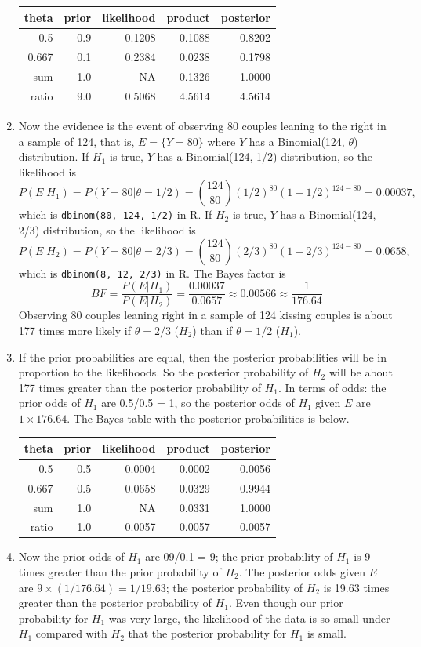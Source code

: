 \documentclass[
]{book}
\theoremstyle{definition}
\theoremstyle{definition}
\theoremstyle{definition}
\theoremstyle{remark}
\begin{document}
\begin{enumerate}
  \begin{tabular}{r|r|r|r|r}
   \hline
   theta & prior & likelihood & product & posterior\\
   \hline
   0.5 & 0.9 & 0.1208 & 0.1088 & 0.8202\\
   \hline
   0.667 & 0.1 & 0.2384 & 0.0238 & 0.1798\\
   \hline
   sum & 1.0 & NA & 0.1326 & 1.0000\\
   \hline
   ratio & 9.0 & 0.5068 & 4.5614 & 4.5614\\
   \hline
   \end{tabular}
\item
  Now the evidence is the event of observing 80 couples leaning to the right in a sample of 124, that is, \(E=\{Y=80\}\) where \(Y\) has a Binomial(124, \(\theta\)) distribution. If \(H_1\) is true, \(Y\) has a Binomial(124, 1/2) distribution, so the likelihood is
  \[
  P(E|H_1) = P(Y = 80|\theta = 1/2) = \binom{124}{80}(1/2)^{80}(1-1/2)^{124-80} = 0.00037,
  \]
  which is \texttt{dbinom(80,\ 124,\ 1/2)} in R. If \(H_2\) is true, \(Y\) has a Binomial(124, 2/3) distribution, so the likelihood is
  \[
  P(E|H_2) = P(Y = 80|\theta = 2/3) = \binom{124}{80}(2/3)^{80}(1-2/3)^{124-80} = 0.0658,
  \]
  which is \texttt{dbinom(8,\ 12,\ 2/3)} in R. The Bayes factor is
  \[
  BF = \frac{P(E|H_1)}{P(E|H_2)} = \frac{0.00037}{0.0657} \approx 0.00566 \approx \frac{1}{176.64}
  \]
  Observing 80 couples leaning right in a sample of 124 kissing couples is about 177 times more likely if \(\theta=2/3\) (\(H_2\)) than if \(\theta = 1/2\) (\(H_1\)).
\item
  If the prior probabilities are equal, then the posterior probabilities will be in proportion to the likelihoods. So the posterior probability of \(H_2\) will be about 177 times greater than the posterior probability of \(H_1\). In terms of odds: the prior odds of \(H_1\) are 0.5/0.5 = 1, so the posterior odds of \(H_1\) given \(E\) are \(1\times 176.64\). The Bayes table with the posterior probabilities is below.

  \begin{tabular}{r|r|r|r|r}
   \hline
   theta & prior & likelihood & product & posterior\\
   \hline
   0.5 & 0.5 & 0.0004 & 0.0002 & 0.0056\\
   \hline
   0.667 & 0.5 & 0.0658 & 0.0329 & 0.9944\\
   \hline
   sum & 1.0 & NA & 0.0331 & 1.0000\\
   \hline
   ratio & 1.0 & 0.0057 & 0.0057 & 0.0057\\
   \hline
   \end{tabular}
\item
  Now the prior odds of \(H_1\) are 09/0.1 = 9; the prior probability of \(H_1\) is 9 times greater than the prior probability of \(H_2\). The posterior odds given \(E\) are \(9\times (1/176.64) = 1/19.63\); the posterior probability of \(H_2\) is 19.63 times greater than the posterior probability of \(H_1\). Even though our prior probability for \(H_1\) was very large, the likelihood of the data is so small under \(H_1\) compared with \(H_2\) that the posterior probability for \(H_1\) is small.


\end{enumerate}
\end{document}

